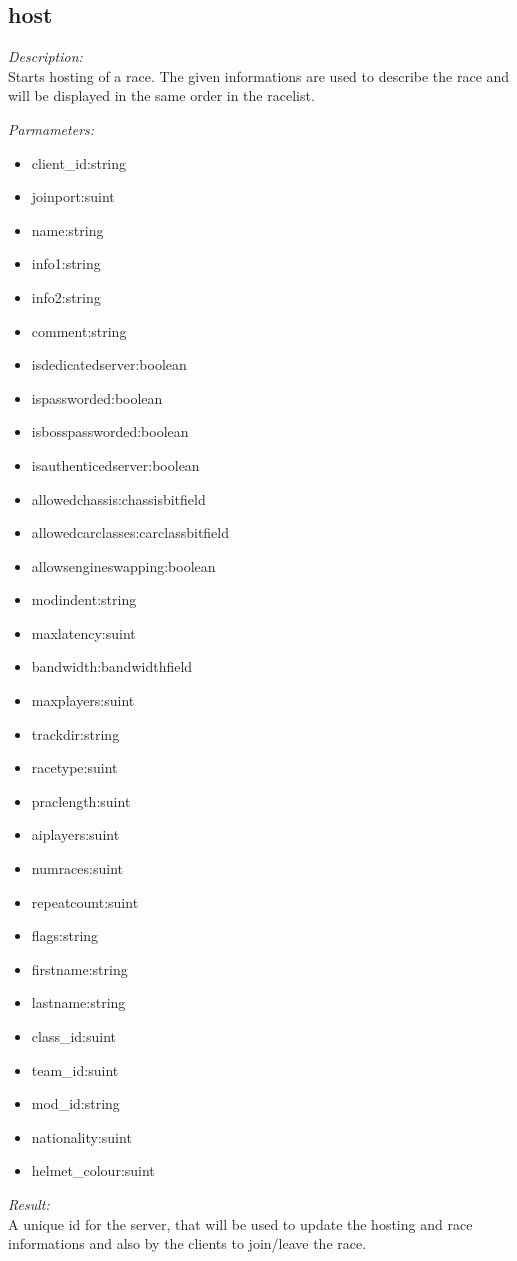 \subsection{host}

\begin{description}
\item {\it Description:}\\
Starts hosting of a race. The given informations are used to describe the race and will be displayed in the same order in the racelist.
\item {\it Parmameters:}
\begin{itemize}
\item client\_id:string
\item joinport:suint
\item name:string
\item info1:string
\item info2:string
\item comment:string
\item isdedicatedserver:boolean
\item ispassworded:boolean
\item isbosspassworded:boolean
\item isauthenticedserver:boolean
\item allowedchassis:chassisbitfield
\item allowedcarclasses:carclassbitfield
\item allowsengineswapping:boolean
\item modindent:string
\item maxlatency:suint
\item bandwidth:bandwidthfield
\item maxplayers:suint
\item trackdir:string
\item racetype:suint
\item praclength:suint
\item aiplayers:suint
\item numraces:suint
\item repeatcount:suint
\item flags:string
\item firstname:string
\item lastname:string
\item class\_id:suint
\item team\_id:suint
\item mod\_id:string
\item nationality:suint
\item helmet\_colour:suint
\end{itemize}
\item {\it Result:}\\
A unique id for the server, that will be used to update the hosting and race informations and also by the clients to join/leave the race.
\end{description}

